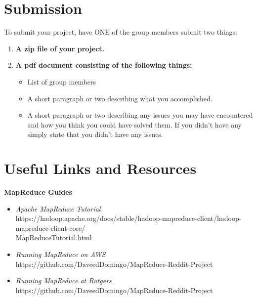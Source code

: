 \documentclass{article}
\begin{document}
\section*{Submission } 
To submit your project, have ONE of the group members submit two things:

\begin{enumerate}
\item \textbf{A zip file of your project.} 
\item \textbf{A pdf document consisting of the following things:}
	\begin{itemize}
	\item List of group members
	\item A short paragraph or two describing what you accomplished.
	\item A short paragraph or two describing any issues you may have encountered and how you think you could have solved them. If you didn't have any simply state that you didn't have any issues.
	\end{itemize}
\end{enumerate}




\section*{Useful Links and Resources} %
\textbf{MapReduce Guides}
\begin{itemize}
    \item \textit{Apache MapReduce Tutorial}\\ https://hadoop.apache.org/docs/stable/hadoop-mapreduce-client/hadoop-mapreduce-client-core/\\MapReduceTutorial.html
    \item \textit{Running MapReduce on AWS}\\ https://github.com/DaveedDomingo/MapReduce-Reddit-Project
    \item \textit{Running MapReduce at Rutgers}\\ https://github.com/DaveedDomingo/MapReduce-Reddit-Project
\end{itemize}




\end{document}
